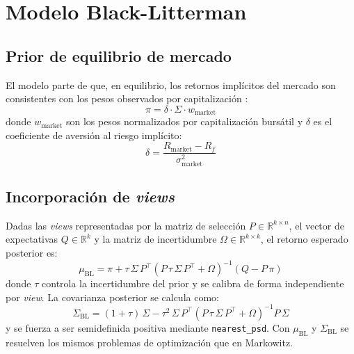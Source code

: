 \section{Modelo Black-Litterman}

\subsection{Prior de equilibrio de mercado}

El modelo parte de que, en equilibrio, los retornos impl\'icitos del mercado
son consistentes con los pesos observados por capitalizaci\'on
\cite{black1992, he1999}:
\begin{equation}
\pi = \delta \cdot \Sigma \cdot w_{\text{market}}
\end{equation}
donde $w_{\text{market}}$ son los pesos normalizados por capitalizaci\'on
burs\'atil y $\delta$ es el coeficiente de aversi\'on al riesgo impl\'icito:
\begin{equation}
\delta = \frac{R_{\text{market}} - R_f}{\sigma_{\text{market}}^2}
\end{equation}

\subsection{Incorporaci\'on de \textit{views}}

Dadas las \textit{views} representadas por la matriz de selecci\'on
$P \in \mathbb{R}^{k \times n}$, el vector de expectativas
$Q \in \mathbb{R}^k$ y la matriz de incertidumbre
$\Omega \in \mathbb{R}^{k \times k}$, el retorno esperado posterior es:
\begin{equation}
\mu_{\text{BL}} = \pi + \tau\,\Sigma\, P^\top
\left(P\,\tau\,\Sigma\, P^\top + \Omega\right)^{-1}
(Q - P\,\pi)
\end{equation}
donde $\tau$ controla la incertidumbre del prior y se calibra de forma
independiente por \textit{view}. La covarianza posterior se calcula como:
\begin{equation}
\Sigma_{\text{BL}} = (1+\tau)\,\Sigma
- \tau^2\,\Sigma\, P^\top
\left(P\,\tau\,\Sigma\, P^\top + \Omega\right)^{-1}
P\,\Sigma
\end{equation}
y se fuerza a ser semidefinida positiva mediante \texttt{nearest\_psd}. Con
$\mu_{\text{BL}}$ y $\Sigma_{\text{BL}}$ se resuelven los mismos problemas de
optimizaci\'on que en Markowitz.


